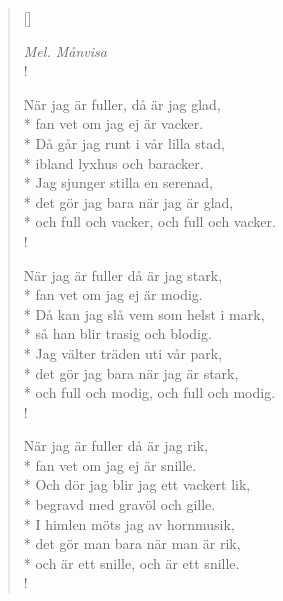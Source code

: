 
\settowidth{\versewidth}{När jag är fuller, då är jag glad,}



\begin{verse}[\versewidth]

\flagverse{}
\emph{Mel. Månvisa}\\!

När jag är fuller, då är jag glad,\\*
fan vet om jag ej är vacker.\\*
Då går jag runt i vår lilla stad,\\*
ibland lyxhus och baracker.\\*
Jag sjunger stilla en serenad,\\*
det gör jag bara när jag är glad,\\*
och full och vacker, och full och vacker.\\!


När jag är fuller då är jag stark,\\*
fan vet om jag ej är modig.\\*
Då kan jag slå vem som helst i mark,\\*
så han blir trasig och blodig.\\*
Jag välter träden uti vår park,\\*
det gör jag bara när jag är stark,\\*
och full och modig, och full och modig.\\!


När jag är fuller då är jag rik,\\*
fan vet om jag ej är snille.\\*
Och dör jag blir jag ett vackert lik,\\*
begravd med gravöl och gille.\\*
I himlen möts jag av hornmusik,\\*
det gör man bara när man är rik,\\*
och är ett snille, och är ett snille.\\!


\end{verse}
